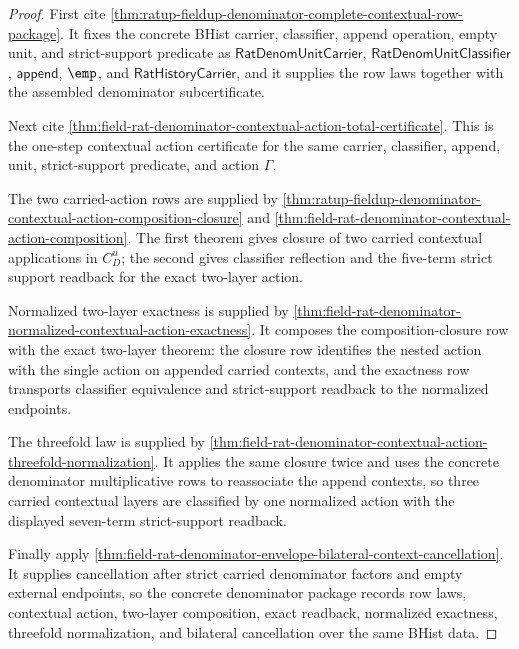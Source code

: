 \begin{proof}
First cite
\autoref{thm:ratup-fieldup-denominator-complete-contextual-row-package}. It
fixes the concrete BHist carrier, classifier, append operation, empty unit,
and strict-support predicate as
$\mathsf{RatDenomUnitCarrier}$, $\mathsf{RatDenomUnitClassifier}$,
$\mathsf{append}$, $\emp$, and $\mathsf{RatHistoryCarrier}$, and it supplies
the row laws together with the assembled denominator subcertificate.

Next cite
\autoref{thm:field-rat-denominator-contextual-action-total-certificate}. This
is the one-step contextual action certificate for the same carrier,
classifier, append, unit, strict-support predicate, and action $\Gamma$.

The two carried-action rows are supplied by
\autoref{thm:ratup-fieldup-denominator-contextual-action-composition-closure}
and \autoref{thm:field-rat-denominator-contextual-action-composition}. The
first theorem gives closure of two carried contextual applications in
$C_D^u$; the second gives classifier reflection and the five-term strict
support readback for the exact two-layer action.

Normalized two-layer exactness is supplied by
\autoref{thm:field-rat-denominator-normalized-contextual-action-exactness}. It
composes the composition-closure row with the exact two-layer theorem: the
closure row identifies the nested action with the single action on appended
carried contexts, and the exactness row transports classifier equivalence and
strict-support readback to the normalized endpoints.

The threefold law is supplied by
\autoref{thm:field-rat-denominator-contextual-action-threefold-normalization}.
It applies the same closure twice and uses the concrete denominator
multiplicative rows to reassociate the append contexts, so three carried
contextual layers are classified by one normalized action with the displayed
seven-term strict-support readback.

Finally apply
\autoref{thm:field-rat-denominator-envelope-bilateral-context-cancellation}.
It supplies cancellation after strict carried denominator factors and empty
external endpoints, so the concrete denominator package records row laws,
contextual action, two-layer composition, exact readback, normalized exactness,
threefold normalization, and bilateral cancellation over the same BHist data.
\end{proof}

